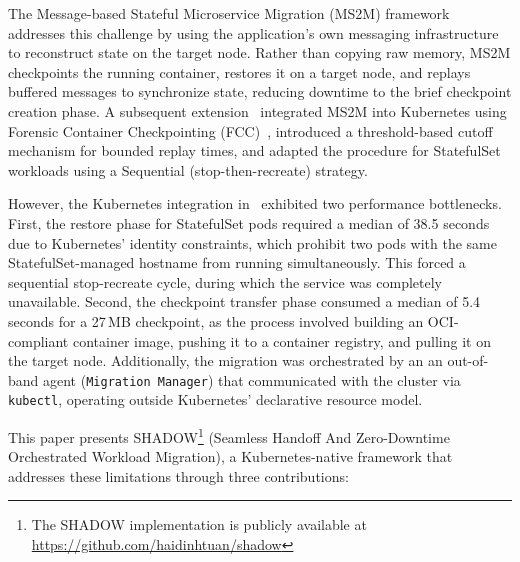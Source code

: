 \documentclass[conference]{IEEEtran}
\begin{document}
The Message-based Stateful Microservice Migration (MS2M)
framework~\cite{dinhtuan2022ms2m} addresses this challenge by using the
application's own messaging infrastructure to reconstruct state on the target
node. Rather than copying raw memory, MS2M checkpoints the running container,
restores it on a target node, and replays buffered messages to synchronize
state, reducing downtime to the brief checkpoint creation phase. A subsequent
extension~\cite{dinhtuan2025k8s} integrated MS2M into Kubernetes using Forensic
Container Checkpointing (FCC)~\cite{k8sfcc}, introduced a threshold-based cutoff
mechanism for bounded replay times, and adapted the procedure for StatefulSet
workloads using a Sequential (stop-then-recreate) strategy.

However, the Kubernetes integration in~\cite{dinhtuan2025k8s} exhibited two
performance bottlenecks. First, the restore phase for StatefulSet
pods required a median of 38.5 seconds due to Kubernetes' identity constraints,
which prohibit two pods with the same StatefulSet-managed hostname from running
simultaneously. This forced a sequential stop-recreate cycle, during which the
service was completely unavailable. Second, the checkpoint transfer phase
consumed a median of 5.4 seconds for a 27\,MB checkpoint, as the process involved
building an OCI-compliant container image, pushing it to a container registry,
and pulling it on the target node. Additionally, the migration was orchestrated
by an an out-of-band agent (\texttt{Migration Manager}) that communicated with the cluster via
\texttt{kubectl}, operating outside Kubernetes' declarative resource model.

This paper presents SHADOW\footnote{The SHADOW implementation is publicly
available at \url{https://github.com/haidinhtuan/shadow}} (Seamless Handoff
And Zero-Downtime Orchestrated Workload Migration), a Kubernetes-native
framework that addresses these limitations through three contributions:
\end{document}
